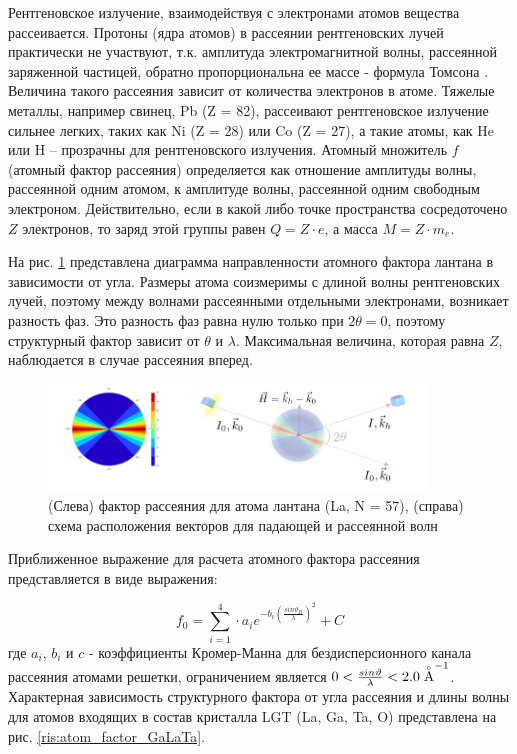 
Рентгеновское излучение, взаимодействуя с электронами атомов вещества рассеивается.
Протоны (ядра атомов) в рассеянии рентгеновских лучей практически не участвуют, т.к.
амплитуда электромагнитной волны, рассеянной заряженной частицей,
 обратно пропорциональна ее массе - формула Томсона \cite{iveronova1972}. Величина такого рассеяния
 зависит от количества электронов в атоме.  Тяжелые металлы,
 например свинец, Pb (Z = 82), рассеивают рентгеновское излучение сильнее легких,
 таких как Ni (Z = 28) или  Co (Z = 27), а такие атомы, как He или H – прозрачны
 для рентгеновского излучения.  Атомный множитель $f$ (атомный фактор рассеяния) определяется
как отношение амплитуды волны, рассеянной одним атомом, к амплитуде волны, рассеянной
одним свободным электроном. Действительно, если в какой либо точке пространства сосредоточено
$Z$ электронов, то заряд этой группы равен $Q = Z\cdot e$, а масса $M = Z \cdot m_e$.

На рис. \ref{ris:atom_factor} представлена диаграмма направленности атомного
фактора лантана в зависимости от угла. Размеры атома соизмеримы с длиной волны
рентгеновских лучей, поэтому между волнами рассеянными отдельными электронами, возникает
разность фаз. Это разность фаз равна нулю только при $2 \theta = 0$, поэтому структурный
фактор зависит от $\theta$ и $\lambda$. Максимальная величина, которая равна $Z$,
 наблюдается в случае рассеяния вперед.

\begin{figure}[H]
  \centering
  \includegraphics[width=0.9\textwidth]{images/atom_factor.png}
  \caption{ (Слева) фактор рассеяния для атома лантана (La, N = 57), (справа)
  схема расположения векторов для падающей и рассеянной волн}
  \label{ris:atom_factor}
\end{figure}

Приближенное выражение для расчета атомного фактора рассеяния
представляется \cite{International_Tables} в виде выражения:

\begin{equation}
  f_0 = \sum_{i=1}^{4} \cdot a_i e^{ -b_i (\frac{sin \vartheta_B}{\lambda})^2} + C
 \end{equation}
где $a_i$, $b_i$ и $c$ - коэффициенты Кромер-Манна для бездисперсионного канала рассеяния атомами решетки,
ограничением является $0<\frac{sin\vartheta}{\lambda}<2.0 \angstrom ^{-1}$.
 Характерная зависимость структурного фактора от угла рассеяния и длины волны
для атомов входящих в состав кристалла LGT (La, Ga, Ta, O) представлена на рис. \ref{ris:atom_factor_GaLaTa}.


